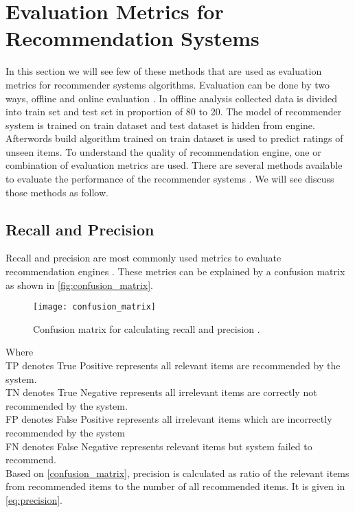 
\section{Evaluation Metrics for Recommendation Systems}

In this section we will see few of these methods that are used as evaluation metrics for recommender systems algorithms. Evaluation can be done by two ways, offline and online evaluation \cite{22,23}. In offline analysis collected data is divided into train set and test set in proportion of 80 to 20. The model of recommender system is trained on train dataset and test dataset is hidden from engine. Afterwords build algorithm trained on train dataset is used to predict ratings of unseen items. To understand the quality of recommendation engine, one or combination of evaluation metrics are used. There are several methods available to evaluate the performance of the recommender systems \cite{22,24}. We will see discuss those methods as follow. 
  
\subsection{Recall and Precision}

Recall and precision are most commonly used metrics to evaluate recommendation engines \cite{25}. These metrics can be explained by a confusion matrix \cite{21} as shown in \autoref{fig:confusion_matrix}.
  
\begin{figure}[H]
	\centering
	\texttt{[image: confusion\_matrix]}
	\caption{Confusion matrix for calculating recall and precision \cite{21}.
	\label{confusion_matrix} }
	\label{fig:confusion_matrix}
\end{figure}

Where\\
TP denotes True Positive represents all relevant items are recommended by the system.\\
TN denotes True Negative represents all irrelevant items are correctly not recommended by the system.  \\
FP denotes False Positive represents all irrelevant items which are
incorrectly recommended by the system\\
FN denotes False Negative represents relevant items but system failed to recommend.\\
Based on \autoref{confusion_matrix}, precision is calculated as ratio of the relevant items from recommended items to the number of all recommended items. It is given in \autoref{eq:precision}. 

